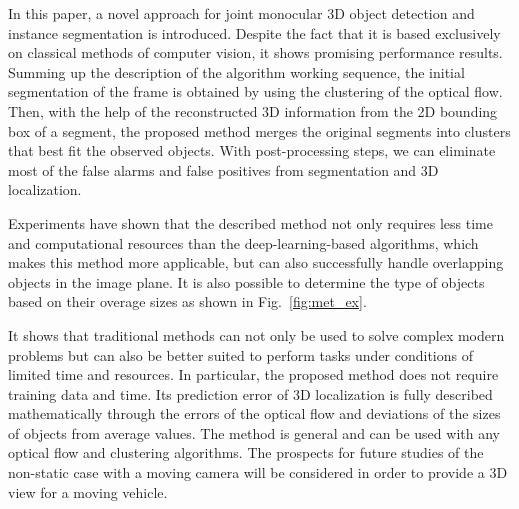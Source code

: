 \documentclass[graybox]{svmult}
\begin{document}
In this paper, a novel approach for joint monocular 3D object detection and instance segmentation is introduced.
Despite the fact that it is based exclusively on classical methods of computer vision, it shows promising performance results.  %
Summing up the description of the algorithm working sequence, the initial segmentation of the frame is obtained by using the clustering of the optical flow.
Then, with the help of the reconstructed 3D information from the 2D bounding box of a segment, the proposed method merges the original segments into clusters that best fit the observed objects. 
With post-processing steps, we can eliminate most of the false alarms and false positives from segmentation and 3D localization.

Experiments have shown that the described method not only requires less time and computational resources than the deep-learning-based  algorithms,
which makes this method more applicable, but can also successfully handle overlapping objects in the image plane.
It is also possible to determine the type of objects based on their overage sizes as shown in Fig.~\ref{fig:met_ex}.

It shows that traditional methods can not only be used to solve complex modern problems but can also be better suited to perform tasks under conditions of limited time and resources.
In particular, the proposed method does not require training data and time. Its prediction error of 3D localization is fully described mathematically through the errors of the optical flow and deviations of the sizes of objects from average values.
The method is general and can be used with any optical flow and clustering algorithms.  The prospects for future studies of the non-static case with a moving camera will be considered in order to provide a 3D view for  a moving vehicle.
\end{document}
